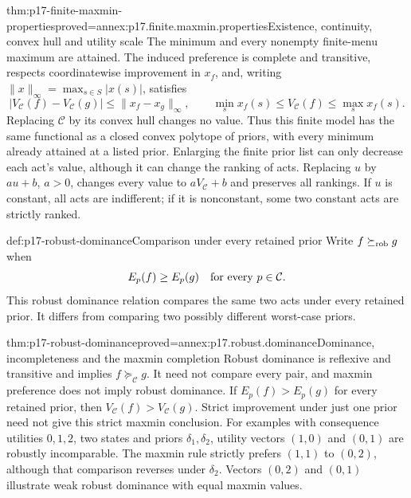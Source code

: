 \begin{hbtheorem}{thm:p17-finite-maxmin-properties}{proved=annex:p17.finite.maxmin.properties}{Existence, continuity, convex hull and utility scale}
The minimum and every nonempty finite-menu maximum are attained.
The induced preference is complete and transitive, respects
coordinatewise improvement in \(x_f\), and, writing
\(\|x\|_\infty=\max_{s\in S}|x(s)|\), satisfies
\[
 |V_{\mathcal C}(f)-V_{\mathcal C}(g)|
                            \leq\|x_f-x_g\|_\infty,\qquad
 \min_s x_f(s)\leq V_{\mathcal C}(f)\leq\max_s x_f(s).
\]
Replacing \(\mathcal C\) by its convex hull changes no value.
Thus this finite model has the same functional as a closed
convex polytope of priors, with every minimum already attained
at a listed prior. Enlarging the finite prior list can only decrease each act's
value, although it can change the ranking of acts.
Replacing \(u\) by \(a u+b\), \(a>0\), changes every value
to \(aV_{\mathcal C}+b\) and preserves all rankings.
If \(u\) is constant, all acts are indifferent; if it is
nonconstant, some two constant acts are strictly ranked.
\end{hbtheorem}

\begin{hbdefinition}{def:p17-robust-dominance}{Comparison under every retained prior}
Write \(f\succeq_{\rm rob}g\) when
\[
                    E_p(f)\geq E_p(g)
                            \quad\hbox{for every }p\in\mathcal C.
\]
This robust dominance relation compares the same two acts
under every retained prior. It differs from comparing two
possibly different worst-case priors.
\end{hbdefinition}

\begin{hbtheorem}{thm:p17-robust-dominance}{proved=annex:p17.robust.dominance}{Dominance, incompleteness and the maxmin completion}
Robust dominance is reflexive and transitive and implies
\(f\succeq_{\mathcal C}g\). It need not compare every pair,
and maxmin preference does not imply robust dominance.
If \(E_p(f)>E_p(g)\) for every retained prior, then
\(V_{\mathcal C}(f)>V_{\mathcal C}(g)\).
Strict improvement under just one prior need not give this
strict maxmin conclusion.
For examples with consequence utilities \(0,1,2\),
two states and priors \(\delta_1,\delta_2\), utility
vectors \((1,0)\) and \((0,1)\) are robustly incomparable.
The maxmin rule strictly prefers \((1,1)\) to \((0,2)\),
although that comparison reverses under \(\delta_2\).
Vectors \((0,2)\) and \((0,1)\) illustrate weak robust
dominance with equal maxmin values.
\end{hbtheorem}

